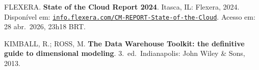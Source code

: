 \documentclass[12pt,a4paper,oneside]{article}
\begin{document}
\begin{singlespace}
\vspace{6pt}
\noindent FLEXERA. \textbf{State of the Cloud Report 2024}.
Itasca, IL: Flexera, 2024. Disponível em:
\href{https://info.flexera.com/CM-REPORT-State-of-the-Cloud}%
{\texttt{info.flexera.com/CM-REPORT-State-of-the-Cloud}}.
Acesso em: 28 abr.\ 2026, 23h18 BRT.

\vspace{6pt}
\noindent KIMBALL, R.; ROSS, M. \textbf{The Data Warehouse Toolkit:
the definitive guide to dimensional modeling}. 3.\ ed.\ Indianapolis:
John Wiley \& Sons, 2013.

\end{singlespace}
\end{document}
